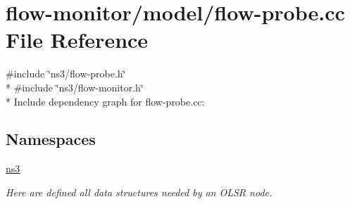 \hypertarget{flow-probe_8cc}{}\section{flow-\/monitor/model/flow-\/probe.cc File Reference}
\label{flow-probe_8cc}
{\ttfamily \#include \char`\"{}ns3/flow-\/probe.\+h\char`\"{}}\\*
{\ttfamily \#include \char`\"{}ns3/flow-\/monitor.\+h\char`\"{}}\\*
Include dependency graph for flow-\/probe.cc\+:
\subsection*{Namespaces}
\begin{DoxyCompactItemize}
\item 
 \hyperlink{namespacens3}{ns3}
\begin{DoxyCompactList}\small\item\em Here are defined all data structures needed by an O\+L\+SR node. \end{DoxyCompactList}\end{DoxyCompactItemize}
